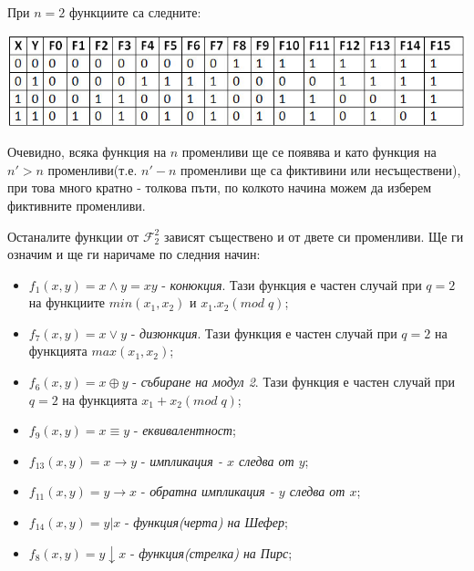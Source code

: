 \documentclass[11pt]{article} %
\begin{document}
\newpage
При $n = 2$ функциите са следните:
\begin{center}
\includegraphics[scale=0.65]{twoVars.jpg}
\end{center}

Очевидно, всяка функция на $n$ променливи ще се появява и като функция на $n' > n$ променливи(т.е. $n' - n$ променливи ще са фиктивини или несъществени), при това много кратно - толкова пъти, по колкото начина можем да изберем фиктивните променливи. \par

Останалите функции от $\mathcal{F}^{2}_{2}$ зависят съществено и от двете си променливи. Ще ги означим и ще ги наричаме по следния начин:

\begin{itemize}
	\item $f_{1}(x,y) = x \wedge y = xy$ - \textit{конюкция}. Тази функция е частен случай при $q = 2$ на функциите $min(x_{1}, x_{2})$ и $x_{1}.x_{2}(mod\;q)$;\\  
	\item $f_{7}(x,y) = x \vee y $ - \textit{дизюнкция}. Тази функция е частен случай при $q = 2$ на функцията $max(x_{1}, x_{2})$;\\  
	\item $f_{6}(x,y) = x \oplus y$ - \textit{събиране на модул 2}. Тази функция е частен случай при $q = 2$ на функцията $x_{1} + x_{2}(mod\;q)$;\\
	\item $f_{9}(x,y) = x \equiv y$ - \textit{еквивалентност};\\  
	\item $f_{13}(x,y) = x \to y$ - \textit{импликация - $x$ следва от $y$};\\
	\item $f_{11}(x,y) = y \to x$ - \textit{обратна импликация - $y$ следва от $x$};\\ 
	\item $f_{14}(x,y) = y | x$ - \textit{функция(черта) на Шефер};\\
	\item $f_{8}(x,y) = y \downarrow x$ - \textit{функция(стрелка) на Пирс};\\       
\end{itemize}
\end{document}
